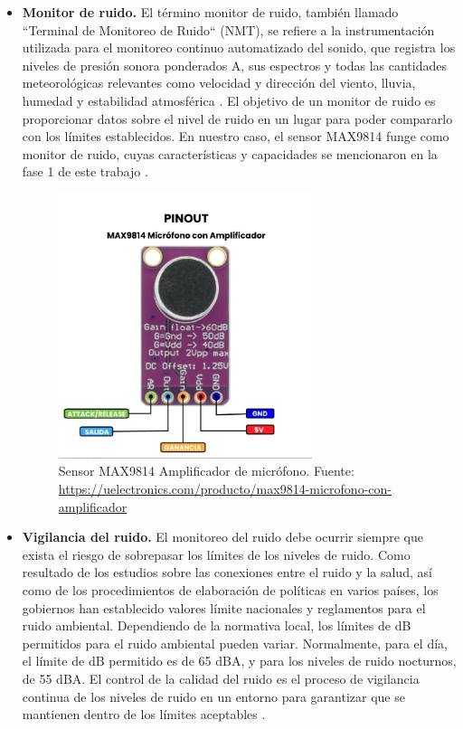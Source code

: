 {{\begin{itemize}
    \item \textbf{Monitor de ruido.} El término monitor de ruido, también llamado ``Terminal de Monitoreo de Ruido`` (NMT), se refiere a la instrumentación utilizada para el monitoreo continuo automatizado del sonido, que registra los niveles de presión sonora ponderados A, sus espectros y todas las cantidades meteorológicas relevantes como velocidad y dirección del viento, lluvia, humedad y estabilidad atmosférica \parencite{Svantek2025MonitoreoDelRuido}. El objetivo de un monitor de ruido es proporcionar datos sobre el nivel de ruido en un lugar para poder compararlo con los límites establecidos. En nuestro caso, el sensor MAX9814 funge como monitor de ruido, cuyas características y capacidades se mencionaron en la fase 1 de este trabajo \parencite{carpio2025}.
 \begin{figure}[H]
   \centering
   \includegraphics[width=0.7\textwidth]{../img/sensor_MAX.png}
   \caption{Sensor MAX9814 Amplificador de micrófono. Fuente: \url{https://uelectronics.com/producto/max9814-microfono-con-amplificador}}
   \label{fig:sensorMAX}
 \end{figure}

    \item \textbf{Vigilancia del ruido.} El monitoreo del ruido debe ocurrir siempre que exista el riesgo de sobrepasar los límites de los niveles de ruido. Como resultado de los estudios sobre las conexiones entre el ruido y la salud, así como de los procedimientos de elaboración de políticas en varios países, los gobiernos han establecido valores límite nacionales y reglamentos para el ruido ambiental. Dependiendo de la normativa local, los límites de dB permitidos para el ruido ambiental pueden variar. Normalmente, para el día, el límite de dB permitido es de 65 dBA, y para los niveles de ruido nocturnos, de 55 dBA. El control de la calidad del ruido es el proceso de vigilancia continua de los niveles de ruido en un entorno para garantizar que se mantienen dentro de los límites aceptables \parencite{Svantek2025MonitoreoDelRuido}.
\end{itemize}

}}
